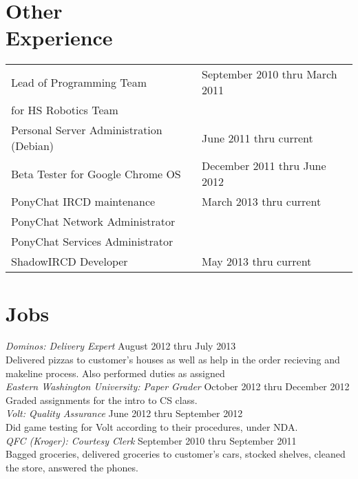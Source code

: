 \documentclass{article}
\begin{document}
\begin{resume}
\section{Other \\ Experience}
\begin{tabular}{l l}
 Lead of Programming Team & \hfill September 2010 thru March 2011 \\ 
 for HS Robotics Team & \\ [6pt]
 Personal Server Administration (Debian) & \hfill June 2011 thru current  \\ [6pt]
 Beta Tester for Google Chrome OS & \hfill December 2011 thru June 2012 \\ [6pt]
 PonyChat IRCD maintenance & \hfill March 2013 thru current \\ 
 PonyChat Network Administrator & \hfill \\ 
 PonyChat Services Administrator & \hfill \\ [6pt]
 ShadowIRCD Developer & \hfill May 2013 thru current \\
\end{tabular}

\section{Jobs}
\textit{Dominos: Delivery Expert} \hfill August 2012 thru July 2013 \\
Delivered pizzas to customer's houses as well as help in the order
recieving and makeline process. Also performed duties as assigned \\ [6pt]
\textit{Eastern Washington University: Paper Grader} \hfill October 2012 thru December 2012 \\
Graded assignments for the intro to CS class. \\ [6pt]
\textit{Volt: Quality Assurance} \hfill June 2012 thru September 2012 \\
Did game testing for Volt according to their procedures, under NDA. \\ [6pt]
\textit{QFC (Kroger): Courtesy Clerk} \hfill September 2010 thru September 2011 \\
Bagged groceries, delivered groceries to customer's cars, stocked
shelves, cleaned the store, answered the phones. \\ [6pt]
     
\end{resume}
\end{document}
